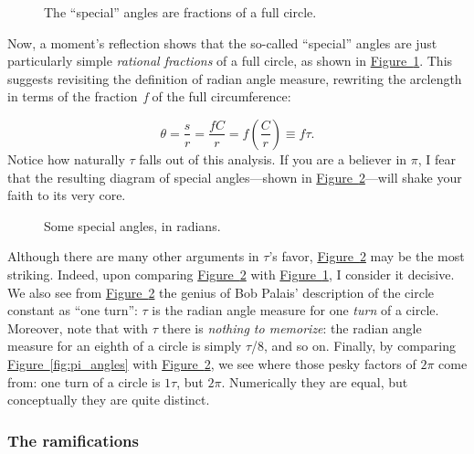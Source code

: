 \documentclass{article}
\begin{document}
\begin{figure}
\begin{center}
\end{center}
\caption{The ``special'' angles are fractions of a full circle.\label{fig:angle_fractions}}
\end{figure}

Now, a moment's reflection shows that the so-called ``special'' angles are just particularly simple \emph{rational fractions} of a full circle, as shown in \hyperref[fig:angle_fractions]{Figure~}\ref{fig:angle_fractions}. This suggests revisiting the definition of radian angle measure, rewriting the arclength in terms of the fraction~\emph{f} of the full circumference:

\[ \theta = \frac{s}{r} = \frac{fC}{r} =  f\left(\frac{C}{r}\right) \equiv f\tau. \]
 Notice how naturally $\tau$ falls out of this analysis. If you are a believer in $\pi$, I fear that the resulting diagram of special angles---shown in \hyperref[fig:tau_angles]{Figure~}\ref{fig:tau_angles}---will shake your faith to its very core. 

\begin{figure}
\begin{center}
\end{center}
\caption{Some special angles, in radians.\label{fig:tau_angles}}
\end{figure}

Although there are many other arguments in $\tau$'s favor, \hyperref[fig:tau_angles]{Figure~}\ref{fig:tau_angles} may be the most striking. Indeed, upon comparing \hyperref[fig:tau_angles]{Figure~}\ref{fig:tau_angles} with \hyperref[fig:angle_fractions]{Figure~}\ref{fig:angle_fractions}, I consider it decisive. We also see from \hyperref[fig:tau_angles]{Figure~}\ref{fig:tau_angles} the genius of Bob Palais' description of the circle constant as ``one turn'': $\tau$ is the radian angle measure for one \emph{turn} of a circle. Moreover, note that with $\tau$ there is \emph{nothing to memorize}: the radian angle measure for an eighth of a circle is simply $\tau$/8, and so on. Finally, by comparing \hyperref[fig:pi_angles]{Figure~}\ref{fig:pi_angles} with \hyperref[fig:tau_angles]{Figure~}\ref{fig:tau_angles}, we see where those pesky factors of $2\pi$ come from: one turn of a circle is $1\tau$, but $2\pi$. Numerically they are equal, but conceptually they are quite distinct.

    \subsubsection{The ramifications} %
    \label{sec:the_ramifications}
    
\end{document}
